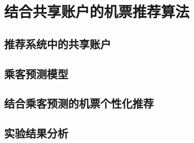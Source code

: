 
\chapter{结合共享账户的机票推荐算法}
\label{chap:share}

\section{推荐系统中的共享账户}

\section{乘客预测模型}

\section{结合乘客预测的机票个性化推荐}

\section{实验结果分析}